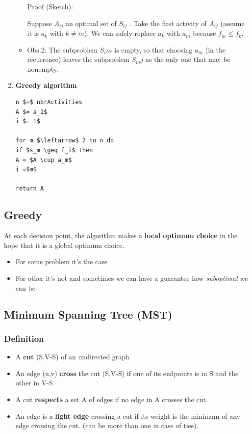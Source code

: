 \begin{enumerate}
\begin{itemize}
                Proof (Sketch):
                \begin{small}
                    Suppose $A_{ij}$ an optimal set of $S_{ij}$ . Take
                    the first activity of $A_{ij}$ (assume it is $a_k$ with $k \neq m$). We
                    can safely replace $a_k$ with $a_m$ because $f_m \leq f_k$.
                \end{small}

            \item Obs.2: The subproblem $S_im$ is empty, so that choosing
                $a_m$ (in the recurrence) leaves the subproblem $S_mj$ as the
                only one that may be nonempty.
        \end{itemize}


    \item \textbf{Greedy algorithm}
        \begin{lstlisting}[mathescape]
n $=$ nbrActivities
A $= a_1$
i $= 1$

for m $\leftarrow$ 2 to n do
if $s_m \geq f_i$ then
A = $A \cup a_m$
i =$m$

return A
        \end{lstlisting}
\end{enumerate}


\subsection{Greedy}
At each decision point, the algorithm makes
a \textbf{local optimum choice} in the hope that it is a global
optimum choice.
\begin{itemize}
    \item For some problem it's the case
    \item For other it's not and sometimes we can 
        have a guarantee how
        \textit{suboptimal} we can be.
\end{itemize}


\subsection{Minimum Spanning Tree (MST)}

\subsubsection{Definition}
\begin{itemize}
    \item A \textbf{cut} (S,V-S) of an undirected graph
    \item An edge (u,v) \textbf{cross} the cut (S,V-S) if one of its
        endpoints is in S and the other in V-S
    \item A cut \textbf{respects} a set A of edges if no edge in A crosses
        the cut.
    \item An edge is a \textbf{light edge} crossing a cut if its weight is
        the minimum of any edge crossing the cut. (can be
        more than one in case of ties).
\end{itemize}

